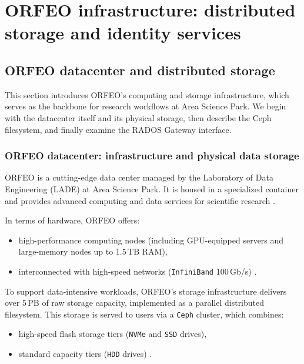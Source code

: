 \chapter{ORFEO infrastructure: distributed storage and identity services}\label{chap:infra}

\section{ORFEO datacenter and distributed storage}

This section introduces ORFEO’s computing and storage infrastructure, which
serves as the backbone for research workflows at Area Science Park. We begin
with the datacenter itself and its physical storage, then describe the Ceph
filesystem, and finally examine the RADOS Gateway interface.

\subsection{ORFEO datacenter: infrastructure and physical data storage}

ORFEO is a cutting-edge data center managed by the Laboratory of Data 
Engineering (LADE) at Area Science Park. It is housed in a specialized container 
and provides advanced computing and data services for scientific 
research \parencite{ORFEO_Docs_Home,LADEPage}. 

\medskip

In terms of hardware, ORFEO offers:
\begin{itemize}
	\item high-performance computing nodes (including GPU-equipped servers 
	and large-memory nodes up to 1.5\,TB RAM), 
	\item interconnected with high-speed networks (\texttt{InfiniBand} 100\,Gb/s) \parencite{ORFEO_Docs_Computational}.
\end{itemize}

To support data-intensive workloads, ORFEO’s storage infrastructure delivers 
over 5\,PB of raw storage capacity, implemented as a parallel distributed 
filesystem. This storage is served to users via a \texttt{Ceph} cluster, which 
combines:
\begin{itemize}
	\item high-speed flash storage tiers (\texttt{NVMe} and \texttt{SSD} drives), 
	\item standard capacity tiers (\texttt{HDD} drives) \parencite{ORFEO_Docs_Storage,orfeo-changelog-2024}.
\end{itemize}


